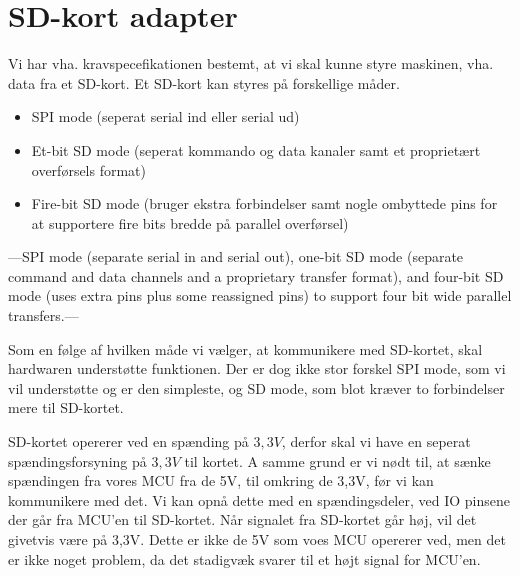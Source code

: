 \section{SD-kort adapter}
Vi har vha. kravspecefikationen bestemt, at vi skal kunne styre
maskinen, vha. data fra et SD-kort. Et SD-kort kan styres på
forskellige måder.

\begin{itemize}
\item{SPI mode (seperat serial ind eller serial ud)}
\item{Et-bit SD mode (seperat kommando og data kanaler samt et
    proprietært overførsels format)}
\item{Fire-bit SD mode (bruger ekstra forbindelser samt nogle
    ombyttede pins for at supportere fire bits bredde på parallel
    overførsel)}
\end{itemize}

---SPI mode (separate serial in and serial out), one-bit SD mode
(separate command and data channels and a proprietary transfer
format), and four-bit SD mode (uses extra pins plus some reassigned
pins) to support four bit wide parallel transfers.---



Som en følge af hvilken måde vi vælger, at kommunikere med SD-kortet,
skal hardwaren understøtte funktionen. Der er dog ikke stor forskel
SPI mode, som vi vil understøtte og er den simpleste, og SD mode, som
blot kræver to forbindelser mere til SD-kortet.

SD-kortet opererer ved en spænding på $3,3V$, derfor skal vi have en
seperat spændingsforsyning på $3,3V$ til kortet. A samme grund er vi
nødt til, at sænke spændingen fra vores MCU fra de 5V, til omkring de
3,3V, før vi kan kommunikere med det. Vi kan opnå dette med en
spændingsdeler, ved IO pinsene der går fra MCU'en til SD-kortet. Når
signalet fra SD-kortet går høj, vil det givetvis være på 3,3V. Dette
er ikke de 5V som voes MCU opererer ved, men det er ikke noget
problem, da det stadigvæk svarer til et højt signal for MCU'en.

